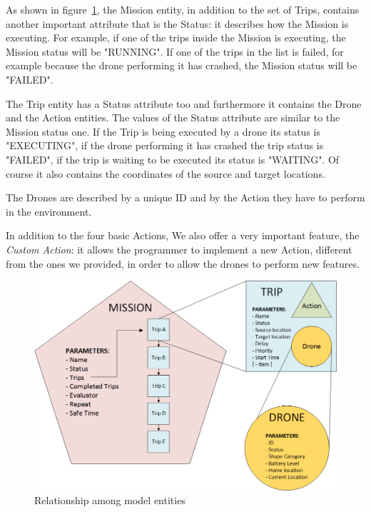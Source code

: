 As shown in figure~\ref{fig:EntityRelationship}, the Mission entity, in addition to the set of Trips, contains another important attribute that is the Status: it describes how the Mission is executing.
For example, if one of the trips inside the Mission is executing, the Mission status will be "RUNNING".
If one of the trips in the list is failed, for example because the drone performing it has crashed, the Mission status will be "FAILED".

The Trip entity has a Status attribute too and furthermore it contains the Drone and the Action entities.
The values of the Status attribute are similar to the Mission status one.
If the Trip is being executed by a drone its status is "EXECUTING", if the drone performing it has crashed the trip status is "FAILED", if the trip is waiting to be executed its status is "WAITING".
Of course it also contains the coordinates of the source and target locations.

The Drones are described by a unique ID and by the Action they have to perform in the environment.

In addition to the four basic Actions, We also offer a very important feature, the \textit{Custom Action}: it allows the programmer to implement a new Action, different from the ones we provided, in order to allow the drones to perform new features.


\newpage

\begin{figure}[htb]
  \centering
  \includegraphics[width=\linewidth]
  {pictures/EntityRelationship.png}
  \caption{Relationship among model entities}
  \label{fig:EntityRelationship}
\end{figure}



